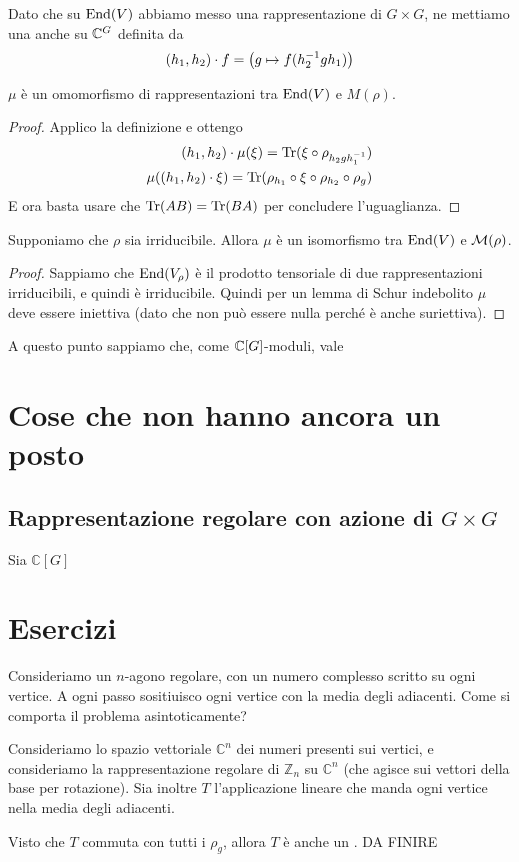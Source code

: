 \documentclass[a4paper,10pt,oneside]{math_article}
\newcommand{\Cyc}{\mathbb Z}
\newcommand{\func}[2][\bC]{#1^{#2}}
\begin{document}
		Dato che su $\operatorname{End} (V)$ abbiamo messo una rappresentazione di $G\times G$, ne mettiamo una anche su $\func G$ definita da 
		\[
		 (h_1,h_2) \cdot f= \left( g \mapsto f(h_2^{-1} g h_1)\right)
		\]
		\begin{myprop}
			$\mu$ è un omomorfismo di rappresentazioni tra $\operatorname{End} (V)$ e $M(\rho)$.		 
		\end{myprop}

		\begin{proof}
		 Applico la definizione e ottengo
		 \begin{eqnarray*}
		  (h_1,h_2)\cdot \mu (\xi) = \operatorname{Tr}(\xi \circ \rho_{h_2gh_1^{-1}})\\
		  \mu((h_1,h_2)\cdot \xi) = \operatorname{Tr}(\rho_{h_1} \circ \xi \circ \rho_{h_2}\circ \rho_g)
		 \end{eqnarray*}
		 E ora basta usare che $\operatorname{Tr}(AB)=\operatorname{Tr}(BA)$ per concludere l'uguaglianza.

		\end{proof}
		
		\begin{mycor}
		 Supponiamo che $\rho$ sia irriducibile. Allora $\mu$ è un isomorfismo tra $\operatorname{End}(V)$ e $\mathcal M(\rho)$. 
		\end{mycor}
		\begin{proof}
		 Sappiamo che $\operatorname{End} (V_\rho)$ è il prodotto tensoriale di due rappresentazioni irriducibili, e quindi è irriducibile. Quindi per un lemma di Schur indebolito $\mu$ deve essere iniettiva (dato che non può essere nulla perché è anche suriettiva).
		\end{proof}
		
		A questo punto sappiamo che, come $\mathbb C[G]$-moduli, vale
		
		



		
  
			
  \section{Cose che non hanno ancora un posto}
   \subsection{Rappresentazione regolare con azione di $G\times G$}
   Sia $\mathbb C[G]$ 
  \section{Esercizi}
  \begin{myex}
   Consideriamo un $n$-agono regolare, con un numero complesso scritto su ogni vertice. A ogni passo sositiuisco ogni vertice con la media degli adiacenti. Come si comporta il problema asintoticamente?
   
   Consideriamo lo spazio vettoriale $\mathbb C^n$ dei numeri presenti sui vertici, e consideriamo la rappresentazione regolare di $\Cyc_n$ su $\mathbb C^n$ (che agisce sui vettori della base per rotazione). Sia inoltre $T$ l'applicazione lineare che manda ogni vertice nella media degli adiacenti.
   
   Visto che $T$ commuta con tutti i $\rho_g$, allora $T$ è anche un . DA FINIRE
  \end{myex}
\end{document}
